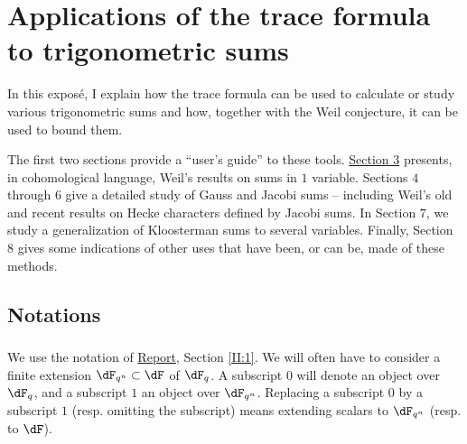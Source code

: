 \documentclass[oneside]{book}
\begin{document}


\chapter{Applications of the trace formula to trigonometric sums}\label{VI}










In this exposé, I explain how the trace formula can be used to calculate 
or study various trigonometric sums and how, together with the 
Weil conjecture, it can be used to bound them.

The first two sections provide a ``user's guide'' to these tools. 
\hyperref[VI:3]{Section 3} presents, in cohomological language, Weil's results on sums in 
$1$ variable. Sections $4$ through $6$ give a 
detailed study of Gauss and Jacobi sums -- including 
Weil's old and recent results on Hecke characters 
defined by Jacobi sums. In Section $7$, we study a 
generalization of Kloosterman sums to several variables. Finally, 
Section $8$ gives some indications of other uses that have been, or can be, 
made of these methods. 










\section*{Notations}\label{VI:0}





\subsection{}\label{VI:0-1}

We use the notation of \hyperref[II]{Report}, Section \ref{II:1}. We 
will often have to consider a finite extension $\dF_{q^n}\subset \dF$ of 
$\dF_q$. A subscript $0$ will denote an object over $\dF_q$, and a subscript $1$ 
an object over $\dF_{q^n}$. Replacing a subscript $0$ by a subscript $1$ (resp. 
omitting the subscript) means extending scalars to $\dF_{q^n}$ (resp. 
to $\dF$).
\end{document}
